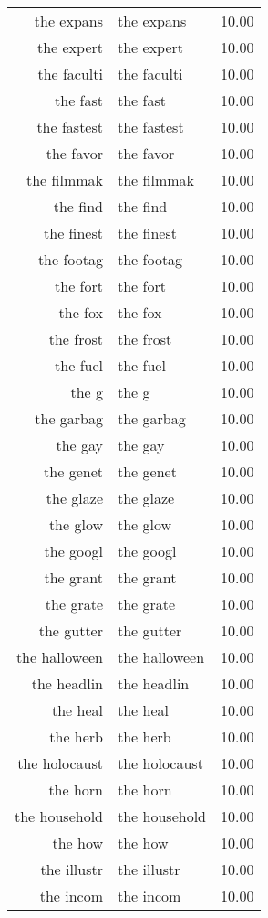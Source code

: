 \begin{table}[ht]
\begin{tabular}{rlr}
  the expans & the expans & 10.00 \\ 
  the expert & the expert & 10.00 \\ 
  the faculti & the faculti & 10.00 \\ 
  the fast & the fast & 10.00 \\ 
  the fastest & the fastest & 10.00 \\ 
  the favor & the favor & 10.00 \\ 
  the filmmak & the filmmak & 10.00 \\ 
  the find & the find & 10.00 \\ 
  the finest & the finest & 10.00 \\ 
  the footag & the footag & 10.00 \\ 
  the fort & the fort & 10.00 \\ 
  the fox & the fox & 10.00 \\ 
  the frost & the frost & 10.00 \\ 
  the fuel & the fuel & 10.00 \\ 
  the g & the g & 10.00 \\ 
  the garbag & the garbag & 10.00 \\ 
  the gay & the gay & 10.00 \\ 
  the genet & the genet & 10.00 \\ 
  the glaze & the glaze & 10.00 \\ 
  the glow & the glow & 10.00 \\ 
  the googl & the googl & 10.00 \\ 
  the grant & the grant & 10.00 \\ 
  the grate & the grate & 10.00 \\ 
  the gutter & the gutter & 10.00 \\ 
  the halloween & the halloween & 10.00 \\ 
  the headlin & the headlin & 10.00 \\ 
  the heal & the heal & 10.00 \\ 
  the herb & the herb & 10.00 \\ 
  the holocaust & the holocaust & 10.00 \\ 
  the horn & the horn & 10.00 \\ 
  the household & the household & 10.00 \\ 
  the how & the how & 10.00 \\ 
  the illustr & the illustr & 10.00 \\ 
  the incom & the incom & 10.00 \\ 

\end{tabular}
\end{table}
